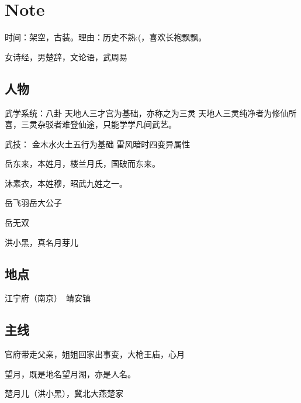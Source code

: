 
\chapter{Note}
\label{note}

时间：架空，古装。理由：历史不熟:(，喜欢长袍飘飘。

女诗经，男楚辞，文论语，武周易

\section{人物}
\label{sec:characters}

武学系统：八卦
天地人三才宫为基础，亦称之为三灵
天地人三灵纯净者为修仙所喜，三灵杂驳者难登仙途，只能学学凡间武艺。

武技：
金木水火土五行为基础
雷风暗时四变异属性


岳东来，本姓月，楼兰月氏，国破而东来。

沐素衣，本姓穆，昭武九姓之一。

岳飞羽岳大公子

岳无双

洪小黑，真名月芽儿

\section{地点}
\label{sec:place}

江宁府（南京）　靖安镇

\section{主线}
\label{sec:main-story}

官府带走父亲，姐姐回家出事变，大枪王庙，心月



望月，既是地名望月湖，亦是人名。

楚月儿（洪小黑），冀北大燕楚家